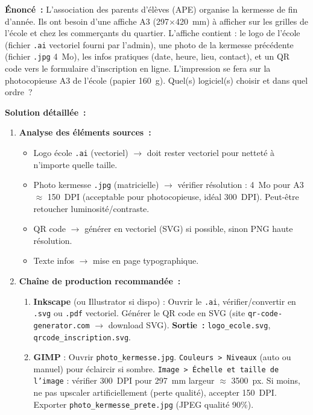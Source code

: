 \documentclass[11pt]{article}
\begin{document}
\begin{exoresolu}
\textbf{Énoncé~:} L'association des parents d'élèves (APE) organise la kermesse de fin d'année. Ils ont besoin d'une affiche A3 (297$\times$420~mm) à afficher sur les grilles de l'école et chez les commerçants du quartier. L'affiche contient : le logo de l'école (fichier \texttt{.ai} vectoriel fourni par l'admin), une photo de la kermesse précédente (fichier \texttt{.jpg} 4~Mo), les infos pratiques (date, heure, lieu, contact), et un QR code vers le formulaire d'inscription en ligne. L'impression se fera sur la photocopieuse A3 de l'école (papier 160~g). Quel(s) logiciel(s) choisir et dans quel ordre~?

\tcblower

\textbf{Solution détaillée~:}
\begin{enumerate}
    \item \textbf{Analyse des éléments sources~:}
    \begin{itemize}
        \item Logo école \texttt{.ai} (vectoriel) $\rightarrow$ doit rester vectoriel pour netteté à n'importe quelle taille.
        \item Photo kermesse \texttt{.jpg} (matricielle) $\rightarrow$ vérifier résolution : 4~Mo pour A3 $\approx$ 150~DPI (acceptable pour photocopieuse, idéal 300~DPI). Peut-être retoucher luminosité/contraste.
        \item QR code $\rightarrow$ générer en vectoriel (SVG) si possible, sinon PNG haute résolution.
        \item Texte infos $\rightarrow$ mise en page typographique.
    \end{itemize}
    \item \textbf{Chaîne de production recommandée~:}
    \begin{enumerate}
        \item \textbf{Inkscape} (ou Illustrator si dispo) : Ouvrir le \texttt{.ai}, vérifier/convertir en \texttt{.svg} ou \texttt{.pdf} vectoriel. Générer le QR code en SVG (site \texttt{qr-code-generator.com} $\rightarrow$ download SVG). \textbf{Sortie~:} \texttt{logo\_ecole.svg}, \texttt{qrcode\_inscription.svg}.
        \item \textbf{GIMP} : Ouvrir \texttt{photo\_kermesse.jpg}. \texttt{Couleurs > Niveaux} (auto ou manuel) pour éclaircir si sombre. \texttt{Image > Échelle et taille de l'image} : vérifier 300~DPI pour 297~mm largeur $\approx$ 3500~px. Si moins, ne pas upscaler artificiellement (perte qualité), accepter 150~DPI. Exporter \texttt{photo\_kermesse\_prete.jpg} (JPEG qualité 90\%).

\end{enumerate}
\end{enumerate}
\end{exoresolu}
\end{document}
